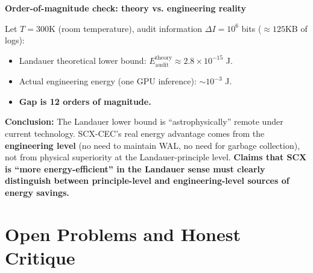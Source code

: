 \documentclass[12pt,a4paper]{article}
\theoremstyle{plain}
\theoremstyle{definition}
\begin{document}
\begin{physicsbox}
\textbf{Order-of-magnitude check: theory vs. engineering reality}

Let $T = 300$K (room temperature), audit information $\Delta I = 10^6$ bits ($\approx 125$KB of logs):
\begin{itemize}
    \item Landauer theoretical lower bound: $E_{\text{audit}}^{\text{theory}} \approx 2.8 \times 10^{-15}$ J.
    \item Actual engineering energy (one GPU inference): $\sim 10^{-3}$ J.
    \item \textbf{Gap is 12 orders of magnitude.}
\end{itemize}

\noindent\textbf{Conclusion:} The Landauer lower bound is ``astrophysically'' remote under current technology.
SCX-CEC's real energy advantage comes from the \textbf{engineering level} (no need to maintain WAL, no need for garbage collection),
not from physical superiority at the Landauer-principle level.
\textbf{Claims that SCX is ``more energy-efficient'' in the Landauer sense must clearly distinguish between principle-level and engineering-level sources of energy savings.}
\end{physicsbox}

\section{Open Problems and Honest Critique}
\label{sec:open}
\end{document}
